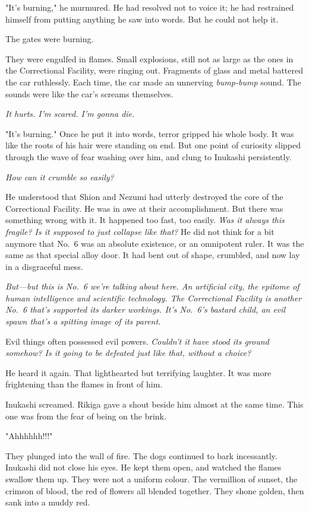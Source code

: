 "It's burning," he murmured. He had resolved not to voice it; he had
restrained himself from putting anything he saw into words. But he could
not help it.

The gates were burning.

They were engulfed in flames. Small explosions, still not as large as
the ones in the Correctional Facility, were ringing out. Fragments of
glass and metal battered the car ruthlessly. Each time, the car made an
unnerving \emph{bump-bump} sound. The sounds were like the car's screams
themselves.

\emph{It hurts. I'm scared. I'm gonna die.}

"It's burning." Once he put it into words, terror gripped his whole
body. It was like the roots of his hair were standing on end. But one
point of curiosity slipped through the wave of fear washing over him,
and clung to Inukashi persistently.

\emph{How can it crumble so easily?}

He understood that Shion and Nezumi had utterly destroyed the core of
the Correctional Facility. He was in awe at their accomplishment. But
there was something wrong with it. It happened too fast, too easily. \emph{Was
it always this fragile? Is it supposed to just collapse like that?} He
did not think for a bit anymore that No.~6 was an absolute existence, or
an omnipotent ruler. It was the same as that special alloy door. It had
bent out of shape, crumbled, and now lay in a disgraceful mess.

\emph{But---but this is No.~6 we're talking about here. An artificial city, the
epitome of human intelligence and scientific technology. The
Correctional Facility is another No.~6 that's supported its darker
workings. It's No.~6's bastard child, an evil spawn that's a spitting
image of its parent.}

Evil things often possessed evil powers. \emph{Couldn't it have stood its
ground somehow? Is it going to be defeated just like that, without a
choice?}


He heard it again. That lighthearted but terrifying laughter. It was
more frightening than the flames in front of him.

Inukashi screamed. Rikiga gave a shout beside him almost at the same
time. This one was from the fear of being on the brink.

"Ahhhhhh!!!"

They plunged into the wall of fire. The dogs continued to bark
incessantly. Inukashi did not close his eyes. He kept them open, and
watched the flames swallow them up. They were not a uniform colour. The
vermillion of sunset, the crimson of blood, the red of flowers all
blended together. They shone golden, then sank into a muddy red.

